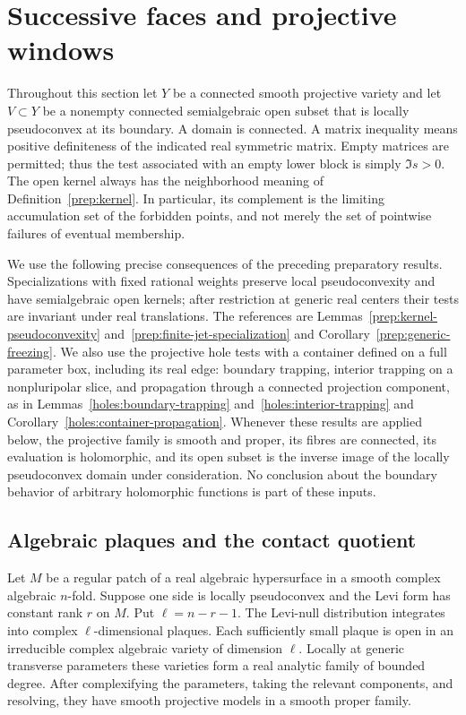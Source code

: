 \section{Successive faces and projective windows}\label{win:section}

Throughout this section let $Y$ be a connected smooth projective variety
and let $V\subset Y$ be a nonempty connected semialgebraic open subset
that is locally pseudoconvex at its boundary.  A domain is connected.
A matrix inequality means
positive definiteness of the indicated real symmetric matrix.  Empty matrices
are permitted; thus the test associated with an empty lower block is simply
$\Im s>0$.  The open kernel always has the neighborhood meaning of
Definition~\ref{prep:kernel}.  In particular, its complement is the limiting
accumulation set of the forbidden points, and not merely the set of pointwise
failures of eventual membership.

We use the following precise consequences of the preceding preparatory
results.  Specializations with fixed rational weights preserve local
pseudoconvexity and have semialgebraic open kernels; after restriction at
generic real centers their tests are invariant under real translations.
The references are Lemmas~\ref{prep:kernel-pseudoconvexity}
and~\ref{prep:finite-jet-specialization} and
Corollary~\ref{prep:generic-freezing}.
We also use the projective hole tests with a container defined on a full
parameter box, including its real edge: boundary trapping, interior trapping
on a nonpluripolar slice, and propagation through a connected projection
component, as in Lemmas~\ref{holes:boundary-trapping}
and~\ref{holes:interior-trapping} and
Corollary~\ref{holes:container-propagation}.
Whenever these results are applied below, the projective family is smooth
and proper, its fibres are connected, its evaluation is holomorphic, and its
open subset is the inverse image of the locally pseudoconvex domain under
consideration.  No conclusion about the boundary behavior of arbitrary
holomorphic functions is part of these inputs.

\subsection{Algebraic plaques and the contact quotient}

\begin{lemma}\label{win:plaques}
Let $M$ be a regular patch of a real algebraic hypersurface in a smooth
complex algebraic $n$-fold.  Suppose one side is locally pseudoconvex and
the Levi form has constant rank $r$ on $M$.  Put $\ell=n-r-1$.
The Levi-null distribution integrates into complex $\ell$-dimensional
plaques.  Each sufficiently small plaque is open in an irreducible complex
algebraic variety of dimension $\ell$.  Locally at generic transverse
parameters these varieties form a real analytic family of bounded degree.
After complexifying the parameters, taking the relevant components, and
resolving, they have smooth projective models in a smooth proper family.
\end{lemma}

